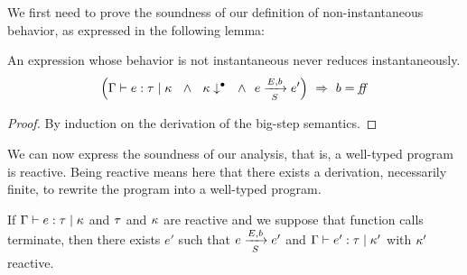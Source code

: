 \documentclass[9pt]{sigplanconf}
\begin{document}
We first need to prove the soundness of our definition of non-instantaneous behavior, as expressed in the following lemma:
\begin{lemma}
\label{lem:noinst}
An expression whose behavior is not instantaneous never reduces instantaneously.
\[
\left( \tyju{\tyenv}{e}{\rt}{\rk}
 \ \ \land\ \  \noinst{\rk} \ \ \land\ \  \bigstep{N}{e}{e'} {E}{b}{S}  \right) \ \Rightarrow\  b = \sfalse \]
\end{lemma}
\begin{proof}
By induction on the derivation of the big-step semantics.
\end{proof}

We can now express the soundness of our analysis, that is, a well-typed program is reactive. Being reactive means here that there exists a derivation, necessarily finite, to rewrite the program into a well-typed program.
\begin{theorem}[Soundness]
\label{thm:soundness}
If \mbox{$\tyju{\tyenv}{e}{\rt}{\rk}$} and $\rt$ and $\rk$ are reactive and we suppose that function calls terminate, then there exists $e'$ such that \mbox{$\bigstep{N}{e}{e'} {E}{b}{S}$} and \mbox{$\tyju{\tyenv}{e'}{\rt}{\rk'}$} with $\rk'$ reactive.
\end{theorem}
\end{document}
